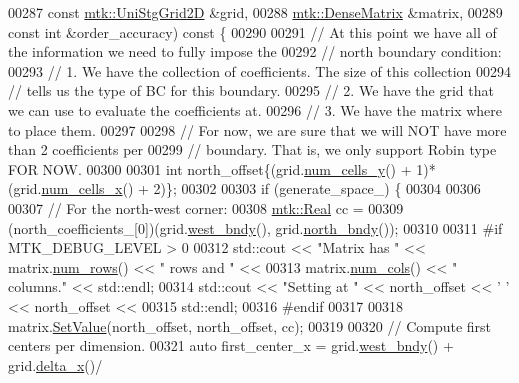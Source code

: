 \begin{DoxyCode}
00287     \textcolor{keyword}{const} \hyperlink{classmtk_1_1UniStgGrid2D}{mtk::UniStgGrid2D} &grid,
00288     \hyperlink{classmtk_1_1DenseMatrix}{mtk::DenseMatrix} &matrix,
00289     \textcolor{keyword}{const} \textcolor{keywordtype}{int} &order\_accuracy)\textcolor{keyword}{ const }\{
00290 
00291   \textcolor{comment}{// At this point we have all of the information we need to fully impose the}
00292   \textcolor{comment}{// north boundary condition:}
00293   \textcolor{comment}{// 1. We have the collection of coefficients. The size of this collection}
00294   \textcolor{comment}{// tells us the type of BC for this boundary.}
00295   \textcolor{comment}{// 2. We have the grid that we can use to evaluate the coefficients at.}
00296   \textcolor{comment}{// 3. We have the matrix where to place them.}
00297 
00298   \textcolor{comment}{// For now, we are sure that we will NOT have more than 2 coefficients per}
00299   \textcolor{comment}{// boundary. That is, we only support Robin type FOR NOW.}
00300 
00301   \textcolor{keywordtype}{int} north\_offset\{(grid.\hyperlink{classmtk_1_1UniStgGrid2D_aed05a801cc9a76dba0ff203cea58a61a}{num\_cells\_y}() + 1)*(grid.\hyperlink{classmtk_1_1UniStgGrid2D_a2d182866a398aba8e4829590e85bf939}{num\_cells\_x}() + 2)\};
00302 
00303   \textcolor{keywordflow}{if} (generate\_space\_) \{
00304 
00306 
00307     \textcolor{comment}{// For the north-west corner:}
00308     \hyperlink{group__c01-roots_gac080bbbf5cbb5502c9f00405f894857d}{mtk::Real} cc =
00309       (north\_coefficients\_[0])(grid.\hyperlink{classmtk_1_1UniStgGrid2D_af2b1712387ded85edaf2b64617d3fc13}{west\_bndy}(), grid.\hyperlink{classmtk_1_1UniStgGrid2D_afe1ead253cdeb5503e0489eba8fd84e2}{north\_bndy}());
00310 
00311 \textcolor{preprocessor}{    #if MTK\_DEBUG\_LEVEL > 0}
00312     std::cout << \textcolor{stringliteral}{"Matrix has "} << matrix.\hyperlink{classmtk_1_1DenseMatrix_a53f3afb3b6a8d21854458aaa9663cc74}{num\_rows}() << \textcolor{stringliteral}{" rows and "} <<
00313       matrix.\hyperlink{classmtk_1_1DenseMatrix_a41747502d468c6728a4be31501b16e0e}{num\_cols}() << \textcolor{stringliteral}{" columns."} << std::endl;
00314     std::cout << \textcolor{stringliteral}{"Setting at "} << north\_offset << \textcolor{charliteral}{' '} << north\_offset <<
00315       std::endl;
00316 \textcolor{preprocessor}{    #endif}
00317 
00318     matrix.\hyperlink{classmtk_1_1DenseMatrix_a784ce5784109ac86bfb9d8562b334b13}{SetValue}(north\_offset, north\_offset, cc);
00319 
00320     \textcolor{comment}{// Compute first centers per dimension.}
00321     \textcolor{keyword}{auto} first\_center\_x = grid.\hyperlink{classmtk_1_1UniStgGrid2D_af2b1712387ded85edaf2b64617d3fc13}{west\_bndy}() + grid.\hyperlink{classmtk_1_1UniStgGrid2D_aca4710004c4a7da6a9e8fd6ab32a691f}{delta\_x}()/

\end{DoxyCode}
